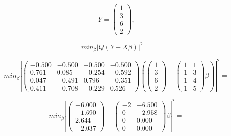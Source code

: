 \documentclass[leqno]{article}
\begin{document}
{\newpage
\clearpage
\samepage \begin{displaymath}Y = \left(\begin{array}{r} 1\\ 3\\ 6\\ 2 \end{array}\right),\end{displaymath}
}

{\newpage
\clearpage
\samepage \begin{displaymath}min_\beta | Q(Y - X \beta)|^2 = \end{displaymath}
}

{\newpage
\clearpage
\samepage \begin{displaymath}min_\beta \left| 
\left(\begin{array}{cccc}
 -0.500 & -0.500 & -0.500 & -0.500\\ 
  0.761 & 0.085  & -0.254 & -0.592\\ 
  0.047 & -0.491 &  0.796 & -0.351\\ 
  0.411 & -0.708 & -0.229 & 0.526
\end{array}\right)
\left(\left(\begin{array}{r} 1\\ 3\\ 6\\ 2 \end{array}\right)
 - 
\left(\begin{array}{cc}
1 & 1 \\ 
1 & 3 \\ 
1 & 4 \\ 
1 & 5
\end{array}\right)
\beta\right)\right|^2 = 
\end{displaymath}
}

{\newpage
\clearpage
\samepage \begin{displaymath}min_\beta \left| 
\left(\begin{array}{r} -6.000 \\  -1.690 \\  2.644 \\  -2.037 \end{array}\right) -
\left(\begin{array}{rr}
 -2 & -6.500\\ 
  0 & -2.958\\ 
  0 & 0.000\\ 
  0 & 0.000
\end{array}\right) \beta
\right|^2=
\end{displaymath}
}
\end{document}
